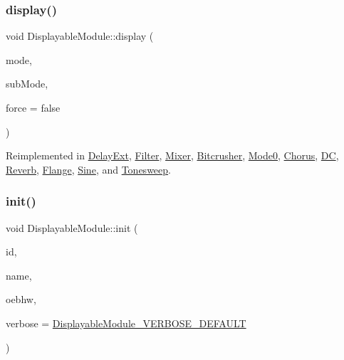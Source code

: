 \mbox{\label{class_displayable_module_a02de26d62ef508cae9ed07920e21784d}} 
\subsubsection{\texorpdfstring{display()}{display()}}
{\footnotesize\ttfamily void Displayable\+Module\+::display (\begin{DoxyParamCaption}\item[{int}]{mode,  }\item[{int}]{sub\+Mode,  }\item[{bool}]{force = {\ttfamily false} }\end{DoxyParamCaption})\hspace{0.3cm}{\ttfamily [virtual]}}



Reimplemented in \mbox{\hyperlink{class_delay_ext_a53d22982c98ab7cc1206744304ecd5a9}{Delay\+Ext}}, \mbox{\hyperlink{class_filter_a3a2062c5c576d18cd734546ca41d29ad}{Filter}}, \mbox{\hyperlink{class_mixer_a13c7c7e025c83d2f9a22b4c16b400551}{Mixer}}, \mbox{\hyperlink{class_bitcrusher_aa5d365b3690a76f968465b9e841720f6}{Bitcrusher}}, \mbox{\hyperlink{class_mode0_a7d43e749cfd1831974f36d7d8e54e221}{Mode0}}, \mbox{\hyperlink{class_chorus_a6a28900025c58af59c7eb70f49347422}{Chorus}}, \mbox{\hyperlink{class_d_c_a006f266e63bdff5042fa2c443e1a04cc}{DC}}, \mbox{\hyperlink{class_reverb_aaf90c9b334f7e1c869c5b406ada68135}{Reverb}}, \mbox{\hyperlink{class_flange_afce68b7e8538cf7bfacdcec8d603f602}{Flange}}, \mbox{\hyperlink{class_sine_a1fcdbe7a2ac18201dfc30cb1dca0b3b3}{Sine}}, and \mbox{\hyperlink{class_tonesweep_ad16e1b0c7eb84827c3ee8a6ae43b0e81}{Tonesweep}}.

\mbox{\label{class_displayable_module_a12010231a6a049a1110b642cc1c83efd}} 
\subsubsection{\texorpdfstring{init()}{init()}}
{\footnotesize\ttfamily void Displayable\+Module\+::init (\begin{DoxyParamCaption}\item[{int}]{id,  }\item[{char $\ast$}]{name,  }\item[{\mbox{\hyperlink{class_open_effects_box_h_w}{Open\+Effects\+Box\+HW}} $\ast$}]{oebhw,  }\item[{int}]{verbose = {\ttfamily \mbox{\hyperlink{_displayable_module_8h_a483eb167fdc6365824170a77f4900236}{Displayable\+Module\+\_\+\+V\+E\+R\+B\+O\+S\+E\+\_\+\+D\+E\+F\+A\+U\+LT}}} }\end{DoxyParamCaption})}


